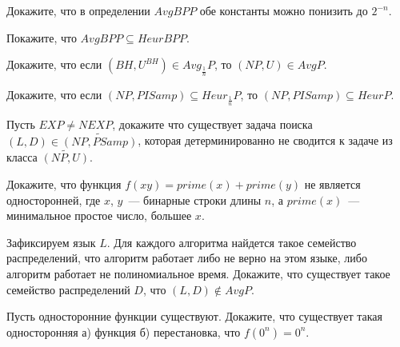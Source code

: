 \setcounter{curtask}{18}


\begin{task}
    Докажите, что в определении $AvgBPP$ обе константы  можно понизить до $2^{-n}$.
\end{task}

\begin{task}
    Покажите, что $AvgBPP \subseteq HeurBPP$.
\end{task}

\begin{task}
    Докажите, что если $(BH, U^{BH}) \in Avg_{\frac{1}{n}}P$, то $(NP, U) \in AvgP$.
\end{task}

\begin{task}
    Докажите, что если $(NP, PISamp) \subseteq Heur_{\frac{1}{n}}P$, то $(NP, PISamp)
    \subseteq HeurP$.
\end{task}

\begin{task}
    Пусть $EXP \neq NEXP$, докажите что существует задача поиска $(L, D) \in
    \widetilde{(NP, PSamp)}$,
    которая детерминированно не сводится к задаче из класса $\widetilde{(NP, U)}$.
\end{task}

\breakline

\begin{ptask}{12}
    Докажите, что функция $f(xy) = prime(x) + prime(y)$ не является односторонней,
    где $x$, $y$~--- бинарные строки длины $n$, а $prime(x)$~--- минимальное простое
    число, большее $x$.
\end{ptask}

\begin{ptask}{14}
    Зафиксируем язык $L$. Для каждого алгоритма найдется такое семейство
    распределений, что алгоритм работает либо не верно на этом языке, либо алгоритм
    работает не полиномиальное время. Докажите, что существует такое семейство
    распределений $D$, что $(L, D) \notin AvgP$.
\end{ptask}

\begin{ptask}{17}
    Пусть односторонние функции существуют.
    Докажите, что существует такая односторонняя а) функция б) перестановка, что
    $f(0^n) = 0^n$.
\end{ptask}



